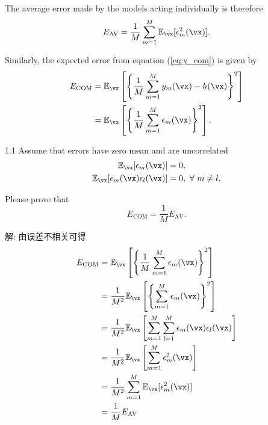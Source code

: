 \documentclass[openany]{ctexbook}
\theoremstyle{kaiti}
\theoremstyle{normal}
\begin{document}
The average error made by the models acting individually is therefore
\begin{equation}
  E_{\text{AV}}=\frac{1}{M}\sum_{m=1}^{M}\mathbb{E}_{\vx}[\epsilon_{m}^{2}(\vx)].
\end{equation}

Similarly, the expected error from equation (\ref{eq:y_com}) is given by
\begin{equation}
  \begin{aligned}
    E_{\text{COM}}
    &=\mathbb{E}_{\vx}\left[\left\{\frac{1}{M}\sum_{m=1}^{M}y_{m}(\vx)-h(\vx)\right\}^{2}\right] \\
    &=\mathbb{E}_{\vx}\left[\left\{\frac{1}{M}\sum_{m=1}^{M}\epsilon_{m}(\vx)\right\}^{2}\right]. \\
  \end{aligned}
\end{equation}

1.1 Assume that errors have zero mean and are uncorrelated
\begin{equation}
  \begin{aligned}
    \mathbb{E}_{\vx}[\epsilon_{m}(\vx)]&=0, \\
    \mathbb{E}_{\vx}[\epsilon_{m}(\vx)\epsilon_{l}(\vx)]&=0,~\forall~m\neq l.
  \end{aligned}
\end{equation}

Please prove that
\begin{equation}
  E_{\text{COM}}=\frac{1}{M}E_{\text{AV}}.
\end{equation}

解: 由误差不相关可得
\begin{equation}
  \begin{aligned}
    E_{\text{COM}}
    &=\mathbb{E}_{\vx}\left[\left\{\frac{1}{M}\sum_{m=1}^{M}\epsilon_{m}(\vx)\right\}^{2}\right]\\
    &=\frac{1}{M^2}\mathbb{E}_{\vx}\left[\left\{\sum_{m=1}^{M}\epsilon_{m}(\vx)\right\}^{2}\right]\\
    &=\frac{1}{M^2}\mathbb{E}_{\vx}\left[\sum_{m=1}^{M}\sum_{l=1}^{M}\epsilon_{m}(\vx)\epsilon_{l}(\vx)\right]\\
    &=\frac{1}{M^2}\mathbb{E}_{\vx}\left[\sum_{m=1}^{M}\epsilon_{m}^2(\vx)\right]\\
    &=\frac{1}{M^2}\sum_{m=1}^{M}\mathbb{E}_{\vx}[\epsilon_{m}^2(\vx)]\\
    &=\frac{1}{M}E_{\text{AV}}\\
  \end{aligned}
\end{equation}
\end{document}
